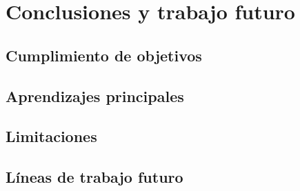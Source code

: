 
\chapter{Conclusiones y trabajo futuro}
\label{cap:conclusiones}


\section{Cumplimiento de objetivos}

\section{Aprendizajes principales}

\section{Limitaciones}

\section{Líneas de trabajo futuro}
